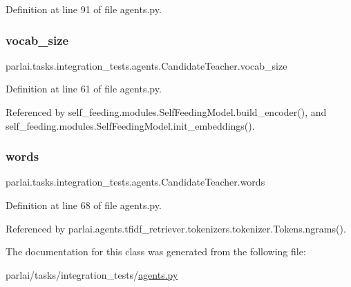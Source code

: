 Definition at line 91 of file agents.\+py.

\mbox{\label{classparlai_1_1tasks_1_1integration__tests_1_1agents_1_1CandidateTeacher_ad01c435d1d55292c1d9ce944b72fab04}} 
\subsubsection{\texorpdfstring{vocab\+\_\+size}{vocab\_size}}
{\footnotesize\ttfamily parlai.\+tasks.\+integration\+\_\+tests.\+agents.\+Candidate\+Teacher.\+vocab\+\_\+size}



Definition at line 61 of file agents.\+py.



Referenced by self\+\_\+feeding.\+modules.\+Self\+Feeding\+Model.\+build\+\_\+encoder(), and self\+\_\+feeding.\+modules.\+Self\+Feeding\+Model.\+init\+\_\+embeddings().

\mbox{\label{classparlai_1_1tasks_1_1integration__tests_1_1agents_1_1CandidateTeacher_af1c895eb9e62a6701be65635a615ec0b}} 
\subsubsection{\texorpdfstring{words}{words}}
{\footnotesize\ttfamily parlai.\+tasks.\+integration\+\_\+tests.\+agents.\+Candidate\+Teacher.\+words}



Definition at line 68 of file agents.\+py.



Referenced by parlai.\+agents.\+tfidf\+\_\+retriever.\+tokenizers.\+tokenizer.\+Tokens.\+ngrams().



The documentation for this class was generated from the following file\+:\begin{DoxyCompactItemize}
\item 
parlai/tasks/integration\+\_\+tests/\hyperlink{parlai_2tasks_2integration__tests_2agents_8py}{agents.\+py}\end{DoxyCompactItemize}
